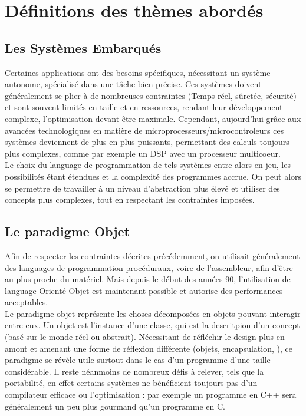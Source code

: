 \documentclass[12pt]{article} %
\begin{document}
\section{Définitions des thèmes abordés} %
\subsection{Les Systèmes Embarqués} 
Certaines applications ont des besoins spécifiques, nécessitant un système autonome, spécialisé dans une tâche bien précise. Ces systèmes doivent généralement se plier à de nombreuses contraintes (Temps réel, sûretée, sécurité) et sont souvent limités en taille et en ressources, rendant leur développement complexe, l'optimisation devant être maximale.
Cependant, aujourd'hui grâce aux avancées technologiques en matière de microprocesseurs/microcontroleurs ces systèmes deviennent de plus en plus puissants, permettant des calculs toujours plus complexes, comme par exemple un DSP avec un processeur multicoeur.\cite{MulticoreDSP}\\
Le choix du language de programmation de tels systèmes entre alors en jeu, les possibilités étant étendues et la complexité des programmes accrue. On peut alors se permettre de travailler à un niveau d'abstraction plus élevé et utiliser des concepts plus complexes, tout en respectant les contraintes imposées.
\subsection{Le paradigme Objet} 
Afin de respecter les contraintes décrites précédemment, on utilisait généralement des languages de programmation procéduraux, voire de l'assembleur, afin d'être au plus proche du matériel.
Mais depuis le début des années 90, l'utilisation de language Orienté Objet est maintenant possible et autorise des performances acceptables.\cite{TimeCritical}\\
Le paradigme objet représente les choses décomposées en objets pouvant interagir entre eux. Un objet est l'instance d'une classe, qui est la descritpion d'un concept (basé sur le monde réel ou abstrait).
Nécessitant de réfléchir le design plus en amont et amenant une forme de réflexion différente (objets, encapsulation, ), ce paradigme se révèle utile surtout dans le cas d'un programme d'une taille considérable.
Il reste néanmoins de nombreux défis à relever, tels que la portabilité, en effet certains systèmes ne bénéficient toujours pas d'un compilateur efficace\cite{DesignPattern} ou l'optimisation : par exemple un programme en C++ sera généralement un peu plus gourmand qu'un programme en C.\cite{OOPEfficient}
\end{document}
